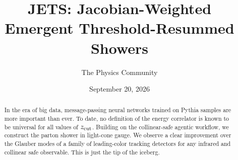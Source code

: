 \documentclass[11pt]{article}
\title{JETS: Jacobian-Weighted Emergent Threshold-Resummed Showers}
\author{The Physics Community}
\date{September 20, 2026}
\numberwithin{equation}{section}
\theoremstyle{definition}
\theoremstyle{remark}
\begin{document}
\maketitle
\begin{abstract}
In the era of big data, message-passing neural networks trained on
Pythia samples are more important than ever. To date, no definition of
the energy correlator is known to be universal for all values of $z_{\rm
cut}$. Building on the collinear-safe agentic workflow, we construct the
parton shower in light-cone gauge. We observe a clear improvement over
the Glauber modes of a family of leading-color tracking detectors for
any infrared and collinear safe observable. This is just the tip of the
iceberg.
\end{abstract}
\tableofcontents





\nocite{*}


\end{document}
